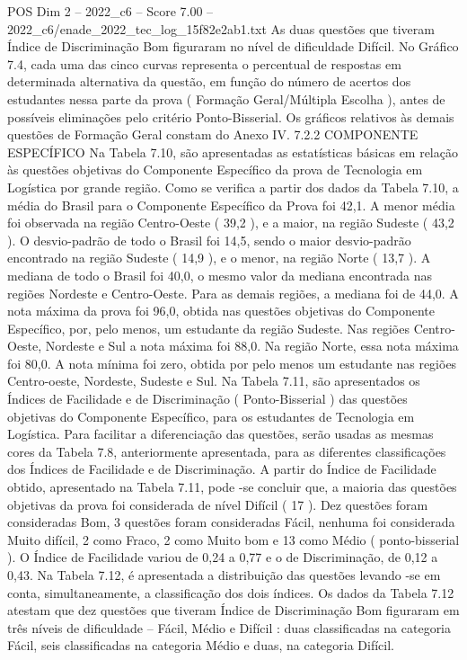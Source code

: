 \begin{textsample}{POS Dim 2 – 2022\_c6 – Score 7.00 – 2022\_c6/enade\_2022\_tec\_log\_15f82e2ab1.txt}
As duas questões que tiveram Índice de Discriminação Bom figuraram no nível de dificuldade Difícil.
No Gráfico 7.4, cada uma das cinco curvas representa o percentual de respostas em determinada alternativa da questão, em função do número de acertos dos estudantes nessa parte da prova ( Formação Geral/Múltipla Escolha ), antes de possíveis eliminações pelo critério Ponto-Bisserial.
Os gráficos relativos às demais questões de Formação Geral constam do Anexo IV. 7.2.2 COMPONENTE ESPECÍFICO Na Tabela 7.10, são apresentadas as estatísticas básicas em relação às questões objetivas do Componente Específico da prova de Tecnologia em Logística por grande região.
Como se verifica a partir dos dados da Tabela 7.10, a média do Brasil para o Componente Específico da Prova foi 42,1.
A menor média foi observada na região Centro-Oeste ( 39,2 ), e a maior, na região Sudeste ( 43,2 ).
O desvio-padrão de todo o Brasil foi 14,5, sendo o maior desvio-padrão encontrado na região Sudeste ( 14,9 ), e o menor, na região Norte ( 13,7 ).
A mediana de todo o Brasil foi 40,0, o mesmo valor da mediana encontrada nas regiões Nordeste e Centro-Oeste.
Para as demais regiões, a mediana foi de 44,0.
A nota máxima da prova foi 96,0, obtida nas questões objetivas do Componente Específico, por, pelo menos, um estudante da região Sudeste.
Nas regiões Centro-Oeste, Nordeste e Sul a nota máxima foi 88,0.
Na região Norte, essa nota máxima foi 80,0.
A nota mínima foi zero, obtida por pelo menos um estudante nas regiões Centro-oeste, Nordeste, Sudeste e Sul.
Na Tabela 7.11, são apresentados os Índices de Facilidade e de Discriminação ( Ponto-Bisserial ) das questões objetivas do Componente Específico, para os estudantes de Tecnologia em Logística.
Para facilitar a diferenciação das questões, serão usadas as mesmas cores da Tabela 7.8, anteriormente apresentada, para as diferentes classificações dos Índices de Facilidade e de Discriminação.
A partir do Índice de Facilidade obtido, apresentado na Tabela 7.11, pode -se concluir que, a maioria das questões objetivas da prova foi considerada de nível Difícil ( 17 ).
Dez questões foram consideradas Bom, 3 questões foram consideradas Fácil, nenhuma foi considerada Muito difícil, 2 como Fraco, 2 como Muito bom e 13 como Médio ( ponto-bisserial ).
O Índice de Facilidade variou de 0,24 a 0,77 e o de Discriminação, de 0,12 a 0,43.
Na Tabela 7.12, é apresentada a distribuição das questões levando -se em conta, simultaneamente, a classificação dos dois índices.
Os dados da Tabela 7.12 atestam que dez questões que tiveram Índice de Discriminação Bom figuraram em três níveis de dificuldade – Fácil, Médio e Difícil : duas classificadas na categoria Fácil, seis classificadas na categoria Médio e duas, na categoria Difícil.

\end{textsample}
